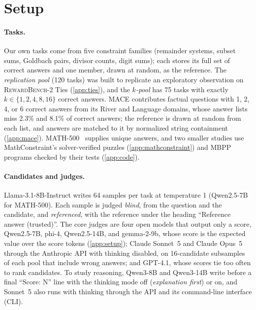 \documentclass{article}
\begin{document}
\section{Setup}
\label{sec:setup}

\paragraph{Tasks.}
Our own tasks come from five constraint families (remainder systems, subset sums, Goldbach pairs, divisor counts, digit sums); each stores its full set of correct answers and one member, drawn at random, as the reference.
The \emph{replication pool} (120 tasks) was built to replicate an exploratory observation on \textsc{RewardBench-2} Ties (\cref{app:ties}), and the \emph{$k$-pool} has 75 tasks with exactly $k \in \{1,2,4,8,16\}$ correct answers.
\textsc{MACE} contributes factual questions with 1, 2, 4, or 6 correct answers from its River and Language domains, whose answer lists miss 2.3\% and 8.1\% of correct answers; the reference is drawn at random from each list, and answers are matched to it by normalized string containment (\cref{app:mace}). MATH-500~\citep{hendrycks2021math} supplies unique answers, and two smaller studies use MathConstraint's solver-verified puzzles (\cref{app:mathconstraint}) and MBPP programs checked by their tests (\cref{app:code}).

\paragraph{Candidates and judges.}
Llama-3.1-8B-Instruct writes 64 samples per task at temperature 1 (Qwen2.5-7B for MATH-500). Each sample is judged \emph{blind}, from the question and the candidate, and \emph{referenced}, with the reference under the heading ``Reference answer (trusted)''.
The core judges are four open models that output only a score, Qwen2.5-7B, phi-4, Qwen2.5-14B, and gemma-2-9b, whose score is the expected value over the score tokens (\cref{app:setup}); Claude Sonnet~5 and Claude Opus~5 through the Anthropic API with thinking disabled, on 16-candidate subsamples of each pool that include wrong answers; and GPT-4.1, whose scores tie too often to rank candidates.
To study reasoning, Qwen3-8B and Qwen3-14B write before a final ``Score: N'' line with the thinking mode off (\emph{explanation first}) or on, and Sonnet~5 also runs with thinking through the API and its command-line interface (CLI).
\end{document}
